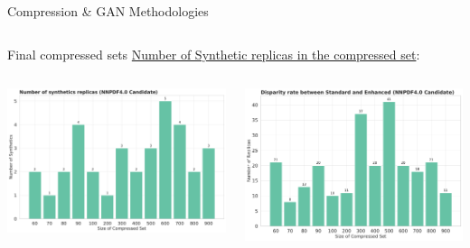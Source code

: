 \begin{frame}{Compression \& GAN Methodologies}
\begin{columns}[T]
\begin{column}{.5\textwidth}
\begin{center}
			\end{center}
		\end{column}
	\end{columns}
\end{frame}

\begin{frame}{Final compressed sets}
	\underline{Number of Synthetic replicas in the compressed set}:
	\begin{columns}[T] 
		\begin{column}{.5\textwidth}
			\includegraphics[width=\linewidth]{./gan_compressor/imgs/countings-nnpdf41.pdf}
		\end{column}
		\hfill
		\begin{column}{.5\textwidth}	
			\includegraphics[width=\linewidth]{./gan_compressor/imgs/disparity.pdf}
		\end{column}
	\end{columns}
\end{frame}


